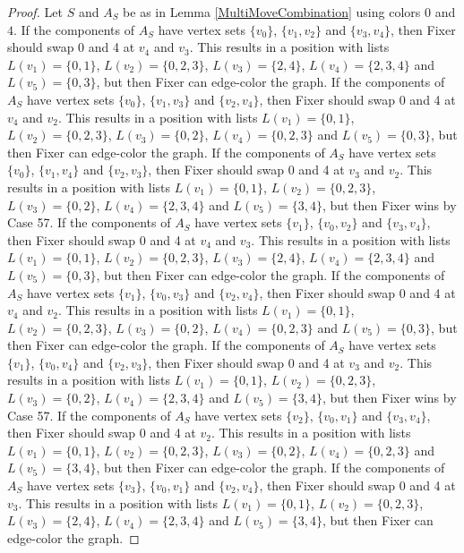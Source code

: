\documentclass[12pt]{amsart}
\theoremstyle{plain}
\theoremstyle{definition}
\theoremstyle{remark}
\begin{document}
\begin{proof}
Let $S$ and $A_S$ be as in Lemma \ref{MultiMoveCombination} using colors $0$ and $4$. If the components of $A_S$ have vertex sets $\{v_0\}$, $\{v_1, v_2\}$ and $\{v_3, v_4\}$, then Fixer should swap 0 and 4 at $v_4$ and $v_3$. This results in a position with lists $L(v_1) = \{0, 1\}$, $L(v_2) = \{0, 2, 3\}$, $L(v_3) = \{2, 4\}$, $L(v_4) = \{2, 3, 4\}$ and $L(v_5) = \{0, 3\}$, but then Fixer can edge-color the graph.
If the components of $A_S$ have vertex sets $\{v_0\}$, $\{v_1, v_3\}$ and $\{v_2, v_4\}$, then Fixer should swap 0 and 4 at $v_4$ and $v_2$. This results in a position with lists $L(v_1) = \{0, 1\}$, $L(v_2) = \{0, 2, 3\}$, $L(v_3) = \{0, 2\}$, $L(v_4) = \{0, 2, 3\}$ and $L(v_5) = \{0, 3\}$, but then Fixer can edge-color the graph.
If the components of $A_S$ have vertex sets $\{v_0\}$, $\{v_1, v_4\}$ and $\{v_2, v_3\}$, then Fixer should swap 0 and 4 at $v_3$ and $v_2$. This results in a position with lists $L(v_1) = \{0, 1\}$, $L(v_2) = \{0, 2, 3\}$, $L(v_3) = \{0, 2\}$, $L(v_4) = \{2, 3, 4\}$ and $L(v_5) = \{3, 4\}$, but then Fixer wins by Case 57.
If the components of $A_S$ have vertex sets $\{v_1\}$, $\{v_0, v_2\}$ and $\{v_3, v_4\}$, then Fixer should swap 0 and 4 at $v_4$ and $v_3$. This results in a position with lists $L(v_1) = \{0, 1\}$, $L(v_2) = \{0, 2, 3\}$, $L(v_3) = \{2, 4\}$, $L(v_4) = \{2, 3, 4\}$ and $L(v_5) = \{0, 3\}$, but then Fixer can edge-color the graph.
If the components of $A_S$ have vertex sets $\{v_1\}$, $\{v_0, v_3\}$ and $\{v_2, v_4\}$, then Fixer should swap 0 and 4 at $v_4$ and $v_2$. This results in a position with lists $L(v_1) = \{0, 1\}$, $L(v_2) = \{0, 2, 3\}$, $L(v_3) = \{0, 2\}$, $L(v_4) = \{0, 2, 3\}$ and $L(v_5) = \{0, 3\}$, but then Fixer can edge-color the graph.
If the components of $A_S$ have vertex sets $\{v_1\}$, $\{v_0, v_4\}$ and $\{v_2, v_3\}$, then Fixer should swap 0 and 4 at $v_3$ and $v_2$. This results in a position with lists $L(v_1) = \{0, 1\}$, $L(v_2) = \{0, 2, 3\}$, $L(v_3) = \{0, 2\}$, $L(v_4) = \{2, 3, 4\}$ and $L(v_5) = \{3, 4\}$, but then Fixer wins by Case 57.
If the components of $A_S$ have vertex sets $\{v_2\}$, $\{v_0, v_1\}$ and $\{v_3, v_4\}$, then Fixer should swap 0 and 4 at $v_2$. This results in a position with lists $L(v_1) = \{0, 1\}$, $L(v_2) = \{0, 2, 3\}$, $L(v_3) = \{0, 2\}$, $L(v_4) = \{0, 2, 3\}$ and $L(v_5) = \{3, 4\}$, but then Fixer can edge-color the graph.
If the components of $A_S$ have vertex sets $\{v_3\}$, $\{v_0, v_1\}$ and $\{v_2, v_4\}$, then Fixer should swap 0 and 4 at $v_3$. This results in a position with lists $L(v_1) = \{0, 1\}$, $L(v_2) = \{0, 2, 3\}$, $L(v_3) = \{2, 4\}$, $L(v_4) = \{2, 3, 4\}$ and $L(v_5) = \{3, 4\}$, but then Fixer can edge-color the graph.

\end{proof}
\end{document}
